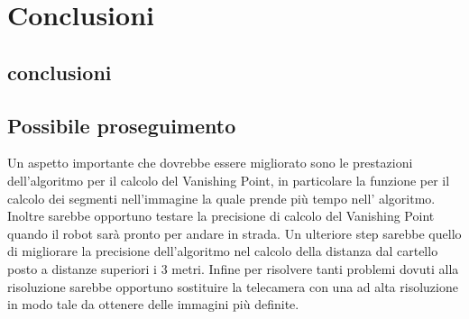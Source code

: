 
\chapter{Conclusioni}

	\section{conclusioni}
	
	\section{Possibile proseguimento}

		Un aspetto importante che dovrebbe essere migliorato sono le prestazioni dell'algoritmo per il calcolo del Vanishing Point, in particolare la funzione per il calcolo dei segmenti nell'immagine la quale prende più tempo nell' algoritmo. Inoltre sarebbe opportuno testare la precisione di calcolo del Vanishing Point quando il robot sarà pronto per andare in strada. Un ulteriore step sarebbe quello di migliorare la precisione dell'algoritmo nel calcolo della distanza dal cartello posto a distanze superiori i 3 metri. Infine per risolvere tanti problemi dovuti alla risoluzione sarebbe opportuno sostituire la telecamera con una ad alta risoluzione in modo tale da ottenere delle immagini più definite.

		